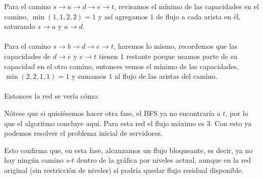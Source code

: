 Para el camino $s\to a\to d\to e\to t$, revisamos el mínimo de las capacidades en el camino, $\min(1,1,2,2) = 1$ y así agregamos $1$ de flujo a cada arista en él, saturando $s\to a$ y $a\to d$.
\\\\
Para el camino $s\to b\to d\to e\to t$, haremos lo mismo, recordemos que las capacidades de $d\to e$ y $e\to t$ tienen 1 restante porque usamos parte de su capacidad en el otro camino, entonces vemos el mínimo de las capacidades, $\min(2,2,1,1) = 1$ y sumamos $1$ al flujo de las aristas del camino.
\\\\
Entonces la red se vería cómo:
\begin{figure}[H]
\centering
{}
\end{figure}
Nótese que si quisiésemos hacer otra fase, el BFS ya no encontraría a $t$, por lo que el algoritmo concluye aquí. Para esta red el flujo máximo es $3$. Con esto ya podemos resolver el problema inicial de servidores.

Esto confirma que, en esta fase, alcanzamos un flujo bloqueante, es decir, ya no hay ningún camino $s$-$t$ dentro de la gráfica por niveles actual, aunque en la red original (sin restricción de niveles) sí podría quedar flujo residual disponible.

